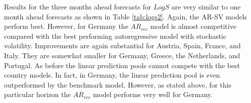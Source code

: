 \documentclass[12pt,letterpaper,fleqn]{article}           %
\begin{document}
Results for the three months ahead forecasts for $LogS$ are very similar to one month ahead forecasts as shown in Table \ref{tab:logs2}. Again, the AR-SV models perform best. However, for Germany the $AR_{rec}$ model is almost competitive compared with the best performing autoregressive model with stochastic volatility. Improvements are again substantial for Austria, Spain, France, and Italy. They are somewhat smaller for Germany, Greece, the Netherlands, and Portugal. As before the linear prediction pools cannot compete with the best country models. In fact, in Germany, the linear prediction pool is even outperformed by the benchmark model. However, as stated above, for this particular horizon the $AR_{rec}$ model performs very well for Germany.

\begin{table}[!htbp] \centering 
{}
\end{table}
\end{document}

